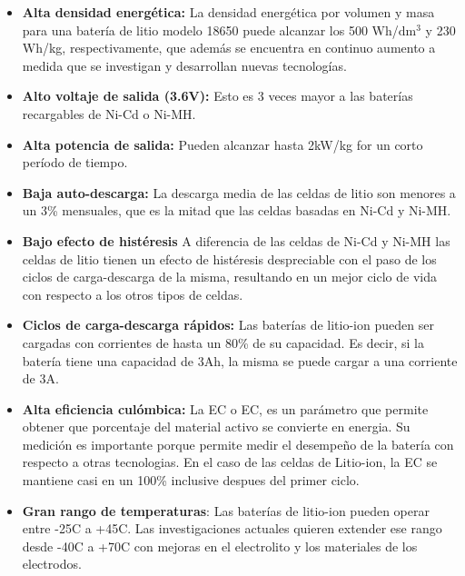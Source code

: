 \documentclass[10pt,a4paper]{article}
\begin{document}
\begin{itemize}
    \item \textbf{Alta densidad energética:} La densidad energética por
	volumen y masa para una batería de litio modelo 18650 puede alcanzar
	los 500 Wh/$\mathrm{dm^3}$ y 230 Wh/kg, respectivamente, que adem\'as
	se encuentra en continuo aumento a medida que se investigan y
	desarrollan nuevas tecnologías.
    \item \textbf{Alto voltaje de salida (3.6V):} Esto es 3 veces 
        mayor a las baterías recargables de Ni-Cd o Ni-MH.
    \item \textbf{Alta potencia de salida:} Pueden alcanzar hasta 2kW/kg for
	un corto per\'iodo de tiempo.
    \item \textbf{Baja auto-descarga:} La descarga media de las celdas de
	litio son menores a un 3\% mensuales, que es la mitad que las celdas
	basadas en Ni-Cd y Ni-MH.
    \item \textbf{Bajo efecto de histéresis} A diferencia de las celdas de
	Ni-Cd y Ni-MH las celdas de litio tienen un efecto de histéresis
	despreciable con el paso de los ciclos de carga-descarga de la
	misma, resultando en un mejor ciclo de vida con respecto a los otros
	tipos de celdas.
    \item \textbf{Ciclos de carga-descarga rápidos:} Las baterías de
	litio-ion pueden ser cargadas con corrientes de hasta un 80\% de su
	capacidad. Es decir, si la batería tiene una capacidad de 3Ah, la
	misma se puede cargar a una corriente de 3A.
    \item \textbf{Alta eficiencia cul\'ombica:} La \acrlong{EC} o \acrshort{EC},
	es un par\'ametro que permite obtener que porcentaje del material
	activo se convierte en energia. Su medici\'on es importante porque 
	permite medir el desempeño de la bater\'ia con respecto a otras 
    tecnologias. En el caso de las celdas de Litio-ion, la \acrlong{EC}
	se mantiene casi en un 100\% inclusive despues del primer ciclo.
    \item \textbf{Gran rango de temperaturas}: Las bater\'ias de litio-ion
	pueden operar entre -25\degree C a +45\degree C. Las
	investigaciones actuales quieren extender ese rango desde -40\degree C a 
    +70\degree C con mejoras en el electrolito y los materiales de los 
    electrodos.


\end{itemize}
\end{document}
